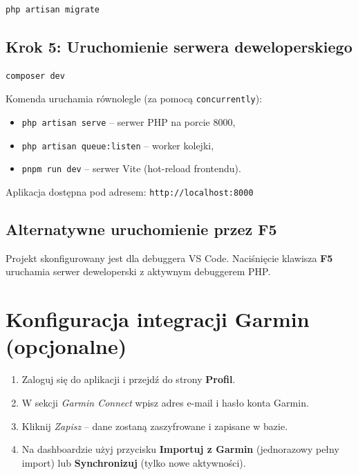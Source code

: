 \documentclass[12pt,a4paper]{report}
\begin{document}
\begin{lstlisting}[language=bash, numbers=none]
php artisan migrate
\end{lstlisting}

\subsection{Krok 5: Uruchomienie serwera deweloperskiego}

\begin{lstlisting}[language=bash, numbers=none]
composer dev
\end{lstlisting}

Komenda uruchamia równolegle (za pomocą \texttt{concurrently}):
\begin{itemize}[noitemsep]
    \item \texttt{php artisan serve} -- serwer PHP na porcie 8000,
    \item \texttt{php artisan queue:listen} -- worker kolejki,
    \item \texttt{pnpm run dev} -- serwer Vite (hot-reload frontendu).
\end{itemize}

Aplikacja dostępna pod adresem: \texttt{http://localhost:8000}

\subsection{Alternatywne uruchomienie przez F5}

Projekt skonfigurowany jest dla debuggera VS Code. Naciśnięcie klawisza \textbf{F5} uruchamia serwer deweloperski z aktywnym debuggerem PHP.

\section{Konfiguracja integracji Garmin (opcjonalne)}

\begin{enumerate}
    \item Zaloguj się do aplikacji i przejdź do strony \textbf{Profil}.
    \item W sekcji \textit{Garmin Connect} wpisz adres e-mail i hasło konta Garmin.
    \item Kliknij \textit{Zapisz} -- dane zostaną zaszyfrowane i zapisane w bazie.
    \item Na dashboardzie użyj przycisku \textbf{Importuj z Garmin} (jednorazowy pełny import) lub \textbf{Synchronizuj} (tylko nowe aktywności).
\end{enumerate}
\end{document}
